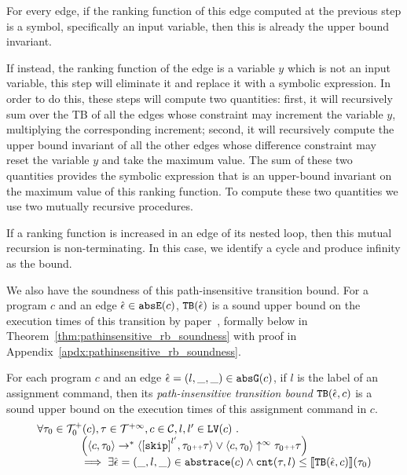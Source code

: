  For every edge, if the ranking function of this edge computed at the previous step is a symbol, specifically an input variable, then this is already the upper bound invariant. 

 If instead, the ranking function of the edge is a variable $y$ which is not an input variable, this step will eliminate it and replace it with a symbolic expression. 
 In order to do this, these steps will compute two quantities: first, it will recursively sum over the TB of all the edges whose constraint may increment the variable $y$, multiplying the corresponding increment; second, it will recursively compute the upper bound invariant of all the other edges whose difference constraint may reset the variable $y$ and take the maximum value. The sum of these two quantities provides the symbolic expression that is an upper-bound invariant on the maximum value of this ranking function. To compute these two quantities we use two mutually recursive procedures.
 
 If a ranking function is increased in an edge of its nested loop, then this mutual recursion is non-terminating. In this case, we identify a cycle and produce infinity as the bound.
 
 
We also have the soundness of this path-insensitive transition bound. For a program $c$ and an edge $\hat{\mathtt{\epsilon}{}} \in \mathtt{abs}{\mathtt{E}}(c)$,
${\mathtt{TB}}(\hat{\mathtt{\epsilon}{}})$ is a sound upper bound
on the execution times of this transition by paper~\cite{SinnZV17}, formally below in Theorem~\ref{thm:pathinsensitive_rb_soundness} with proof in Appendix~\ref{apdx:pathinsensitive_rb_soundness}.
%
\begin{thm}
 \label{thm:pathinsensitive_rb_soundness}
For each program ${c}$ and an edge $\hat{\mathtt{\epsilon}{}} = (l, \_, \_) \in \mathtt{abs}{\mathtt{G}}(c)$, if $l$ is the label of an assignment command,
then its \emph{path-insensitive transition bound} ${\mathtt{TB}}(\hat{\mathtt{\epsilon}{}}, c)$ 
 is a sound upper bound on 
the execution times of this assignment command in $c$.
 \[
 \begin{array}{l}
 \forall \trace_0 \in \ftdom_0(c), \trace \in \tdom, c \in \cdom, l, l' \in \lvar(c) \sthat
 \\ \qquad \qquad
 \Big( \config{c, \trace_0} \rightarrow^{*} \config{\clabel{\eskip}^{l'}, \trace_0 \tracecat \trace} 
 \lor \config{c, \trace_0} \uparrow^{\infty} \trace_0 \tracecat \trace \Big)
 \\ \qquad \qquad
 \implies
 \exists \absevent = (\_, l, \_) \in \absflow(c) \land
 \counter(\trace, l) \leq \econfig{\absclr(\absevent, c)}(\trace_0)
 \end{array}
 \]
\end{thm}
%
